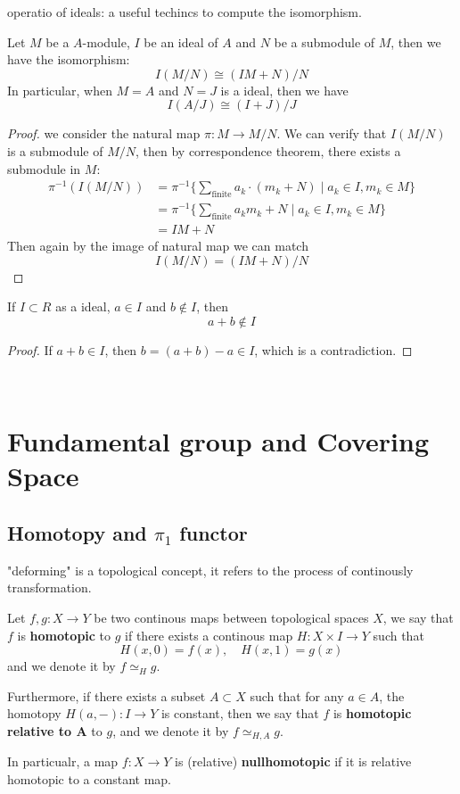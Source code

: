 \documentclass[12pt,a4paper]{article}
\begin{document}
operatio of ideals: a useful techincs to compute the isomorphism.
\begin{proposition}
    Let \(M\) be a \(A\)-module, \(I\) be an ideal of \(A\) and \(N\) be a submodule of \(M\), then we have the isomorphism:
    \[I(M/N) \cong (IM+N)/N\]
    In particular, when \(M=A\) and \(N = J\) is a ideal, then we have
    \[I(A/J) \cong (I+J)/J\]
\end{proposition}
\begin{proof}
    we consider the natural map \(\pi: M \to M/N\). We can verify that \(I(M/N)\) is a submodule of \(M/N\), then by correspondence theorem, there exists a submodule in \(M\):
    \begin{align*}
    \pi^{-1}(I(M/N)) &= \pi^{-1}\{\sum_{\text{finite}}a_k\cdot(m_k+N) \mid a_k \in I, m_k \in M \}\\
    &= \pi^{-1}\{\sum_{\text{finite}} a_k m_k + N \mid a_k \in I, m_k \in M\} \\
    &= IM + N
    \end{align*}
    Then again by the image of natural map we can match
    \[I(M/N) = (IM+N)/N\]
\end{proof}

\begin{proposition}
    If \(I \subset R\) as a ideal, \(a \in I\) and \(b \notin I\), then 
    \[a+b \notin I\]
\end{proposition}
\begin{proof}
    If \(a+b \in I\), then \(b = (a+b) - a \in I\), which is a contradiction.
\end{proof}\




\section{Fundamental group and Covering Space}
\subsection{Homotopy and \(\pi_1\) functor}

"deforming" is a topological concept, it refers to the process of continously transformation.

\begin{definitionplain}
    Let \(f,g :X \to Y\) be two continous maps between topological spaces \(X\), we say that \(f\) is \textbf{homotopic} to \(g\) if there exists a continous map \(H:X \times I \to Y\) such that
    \[H(x,0) = f(x), \quad H(x,1) = g(x)\]
    and we denote it by \(f \simeq_H g\). 
    
    Furthermore, if there exists a subset \(A \subset X\) such that for any \(a \in A\), the homotopy \(H(a,-): I \to Y\) is constant, then we say that \(f\) is \textbf{homotopic relative to A} to \(g\), and we denote it by \(f \simeq_{H,A} g\).

    In particualr, a map \(f:X \to Y\) is (relative) \textbf{nullhomotopic} if it is relative homotopic to a constant map.
\end{definitionplain}
\end{document}
